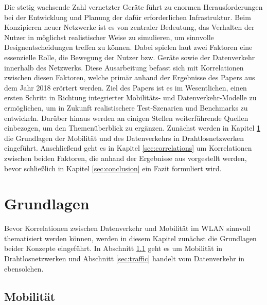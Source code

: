 \documentclass[12pt, a4paper]{article}
\begin{document}
Die stetig wachsende Zahl vernetzter Geräte führt zu enormen Herausforderungen bei der Entwicklung
und Planung der dafür erforderlichen Infrastruktur. Beim Konzipieren neuer Netzwerke ist es von zentraler
Bedeutung, das Verhalten der Nutzer in möglichst realistischer Weise zu simulieren, um sinnvolle Designentscheidungen
treffen zu können. Dabei spielen laut \cite{Alipour2018} zwei Faktoren eine essenzielle Rolle, die Bewegung der Nutzer bzw. Geräte
sowie der Datenverkehr innerhalb des Netzwerks.
Diese Ausarbeitung befasst sich mit Korrelationen zwischen diesen Faktoren,
welche primär anhand der Ergebnisse des Papers  \cite{Alipour2018} aus dem Jahr 2018 erörtert werden.
Ziel des Papers ist es im Wesentlichen, einen ersten Schritt in Richtung integrierter Mobilitäts- und Datenverkehr-Modelle 
zu ermöglichen, um in Zukunft realistischere Test-Szenarien und Benchmarks zu entwickeln.
Darüber hinaus werden an einigen Stellen weiterführende Quellen einbezogen, um den Themenüberblick zu ergänzen.\newline
Zunächst werden in Kapitel \ref{sec:basics} die Grundlagen der Mobilität und des Datenverkehrs in Drahtlosnetzwerken
eingeführt. Anschließend geht es in Kapitel \ref{sec:correlations} um Korrelationen zwischen beiden
Faktoren, die anhand der Ergebnisse aus \cite{Alipour2018} vorgestellt werden,
bevor schließlich in Kapitel \ref{sec:conclusion} ein Fazit formuliert wird.

\section{Grundlagen}
\label{sec:basics}

Bevor Korrelationen zwischen Datenverkehr und Mobilität im WLAN sinnvoll thematisiert werden können, 
werden in diesem Kapitel zunächst die Grundlagen beider Konzepte eingeführt.
In Abschnitt \ref{sec:mobility} geht es um Mobilität in Drahtlosnetzwerken und Abschnitt \ref{sec:traffic} handelt
vom Datenverkehr in ebensolchen.

\subsection{Mobilität}
\label{sec:mobility}
\end{document}
